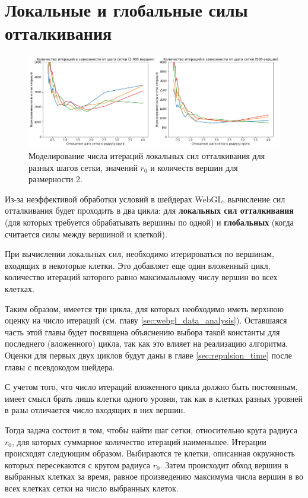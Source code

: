 \section{Локальные и глобальные силы отталкивания}
\label{sec:iter_estimate}

\begin{figure}[h!]
  \centering
  \includegraphics[width=\textwidth]{grid_step_2.png}
  \caption{Моделирование числа итераций локальных сил отталкивания для разных шагов сетки, значений $r_0$ и количеств вершин для размерности 2.}
  \label{fig:grid_step}
\end{figure}

Из-за неэффективой обработки условий в шейдерах WebGL, вычисление сил отталкивания будет проходить в два цикла: для {\bfseries локальных сил отталкивания} (для которых требуется обрабатывать вершины по одной) и {\bfseries глобальных} (когда считается силы между вершиной и клеткой).

При вычислении локальных сил, необходимо итерироваться по вершинам, входящих в некоторые клетки. Это добавляет еще один вложенный цикл, количество итераций которого равно максимальному числу вершин во всех клетках.

Таким образом, имеется три цикла, для которых необходимо иметь верхнюю оценку на число итераций (см. главу \ref{sec:webgl_data_analysis}). Оставшаяся часть этой главы будет посвящена объяснению выбора такой константы для последнего (вложенного) цикла, так как это влияет на реализацию алгоритма. Оценки для первых двух циклов будут даны в главе \ref{sec:repulsion_time} после главы с псевдокодом шейдера.

С учетом того, что число итераций вложенного цикла должно быть постоянным, имеет смысл брать лишь клетки одного уровня, так как в клетках разных уровней в разы отличается число входящих в них вершин.

Тогда задача состоит в том, чтобы найти шаг сетки, относительно круга радиуса $r_0$, для которых суммарное количество итераций наименьшее. Итерации происходят следующим образом. Выбираются те клетки, описанная окружность которых пересекаются с кругом радиуса $r_0$. Затем происходит обход вершин в выбранных клетках за время, равное произведению максимума числа вершин в во всех клетках сетки на число выбранных клеток.

